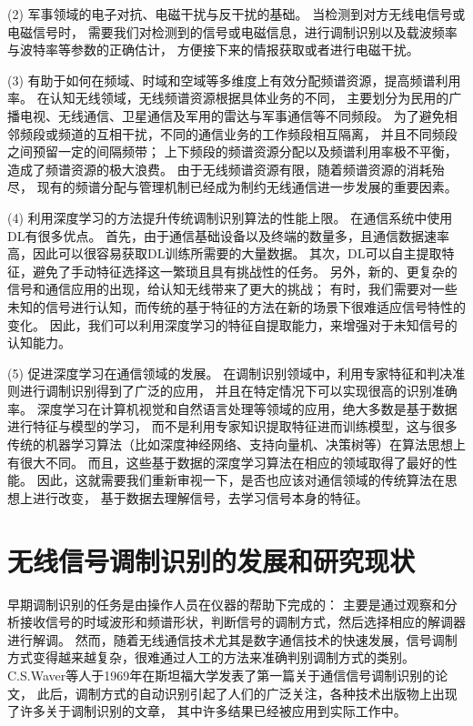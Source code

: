 (2) 军事领域的电子对抗、电磁干扰与反干扰的基础。
当检测到对方无线电信号或电磁信号时，
需要我们对检测到的信号或电磁信息，进行调制识别以及载波频率与波特率等参数的正确估计，
方便接下来的情报获取或者进行电磁干扰。\par

(3) 有助于如何在频域、时域和空域等多维度上有效分配频谱资源，提高频谱利用率。
在认知无线领域，无线频谱资源根据具体业务的不同，
主要划分为民用的广播电视、无线通信、卫星通信及军用的雷达与军事通信等不同频段。
为了避免相邻频段或频道的互相干扰，不同的通信业务的工作频段相互隔离，
并且不同频段之间预留一定的间隔频带；
上下频段的频谱资源分配以及频谱利用率极不平衡，造成了频谱资源的极大浪费。
由于无线频谱资源有限，随着频谱资源的消耗殆尽，
现有的频谱分配与管理机制已经成为制约无线通信进一步发展的重要因素。\par

(4) 利用深度学习的方法提升传统调制识别算法的性能上限。
在通信系统中使用DL有很多优点。 首先，由于通信基础设备以及终端的数量多，且通信数据速率高，因此可以很容易获取DL训练所需要的大量数据。
其次，DL可以自主提取特征，避免了手动特征选择这一繁琐且具有挑战性的任务。
另外，新的、更复杂的信号和通信应用的出现，给认知无线带来了更大的挑战；
有时，我们需要对一些未知的信号进行认知，而传统的基于特征的方法在新的场景下很难适应信号特性的变化。
因此，我们可以利用深度学习的特征自提取能力，来增强对于未知信号的认知能力。\par

(5) 促进深度学习在通信领域的发展。
在调制识别领域中，利用专家特征和判决准则进行调制识别得到了广泛的应用，
并且在特定情况下可以实现很高的识别准确率。
深度学习在计算机视觉和自然语言处理等领域的应用，绝大多数是基于数据进行特征与模型的学习，
而不是利用专家知识提取特征进而训练模型，这与很多传统的机器学习算法（比如深度神经网络、支持向量机、决策树等）在算法思想上有很大不同。
而且，这些基于数据的深度学习算法在相应的领域取得了最好的性能。
因此，这就需要我们重新审视一下，是否也应该对通信领域的传统算法在思想上进行改变，
基于数据去理解信号，去学习信号本身的特征。\par

\section{无线信号调制识别的发展和研究现状}

早期调制识别的任务是由操作人员在仪器的帮助下完成的：
主要是通过观察和分析接收信号的时域波形和频谱形状，判断信号的调制方式，然后选择相应的解调器进行解调。
然而，随着无线通信技术尤其是数字通信技术的快速发展，信号调制方式变得越来越复杂，很难通过人工的方法来准确判别调制方式的类别。 
C.S.Waver等人于1969年在斯坦福大学发表了第一篇关于通信信号调制识别的论文\cite{weaver1969automatic}，
此后，调制方式的自动识别引起了人们的广泛关注，各种技术出版物上出现了许多关于调制识别的文章，
其中许多结果已经被应用到实际工作中。 \par

